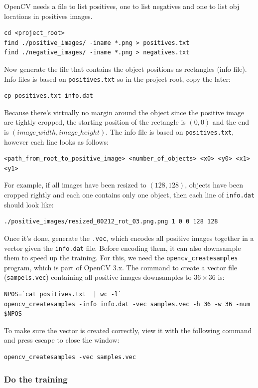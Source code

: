 \documentclass[a4paper]{article}
\begin{document}
OpenCV needs a file to list positives, one to list negatives and one to list obj locations in positives images.
\begin{verbatim}
cd <project_root>
find ./positive_images/ -iname *.png > positives.txt
find ./negative_images/ -iname *.png > negatives.txt
\end{verbatim}
Now generate the file that contains the object positions as rectangles (info file). Info files is based on \texttt{positives.txt} so in the project root, copy the later:
\begin{verbatim}
cp positives.txt info.dat
\end{verbatim}
Because there's virtually no margin around the object since the positive image are tightly cropped, the starting position of the rectangle is $(0,0)$ and the end is $(image\_width, image\_height)$. The info file is based on \texttt{positives.txt}, however each line looks as follows:
\begin{verbatim}
<path_from_root_to_positive_image> <number_of_objects> <x0> <y0> <x1> <y1>
\end{verbatim}
For example, if all images have been resized to $(128, 128)$, objects have been cropped rightly and each one contains only one object, then each line of \texttt{info.dat} should look like:
\begin{verbatim}
./positive_images/resized_00212_rot_03.png.png 1 0 0 128 128
\end{verbatim}
Once it's done, generate the \texttt{.vec}, which encodes all positive images together in a vector given the \texttt{info.dat} file. Before encoding them, it can also downsample them to speed up the training. For this, we need the \texttt{opencv_createsamples} program, which is part of OpenCV 3.x. The command to create a vector file (\texttt{sampels.vec}) containing all positive images downsamples to $36\times 36$ is:
\begin{verbatim}
NPOS=`cat positives.txt  | wc -l`
opencv_createsamples -info info.dat -vec samples.vec -h 36 -w 36 -num $NPOS
\end{verbatim}
To make sure the vector is created correctly, view it with the following command and press escape to close the window:
\begin{verbatim}
opencv_createsamples -vec samples.vec    
\end{verbatim}


\subsubsection{Do the training}
\end{document}
